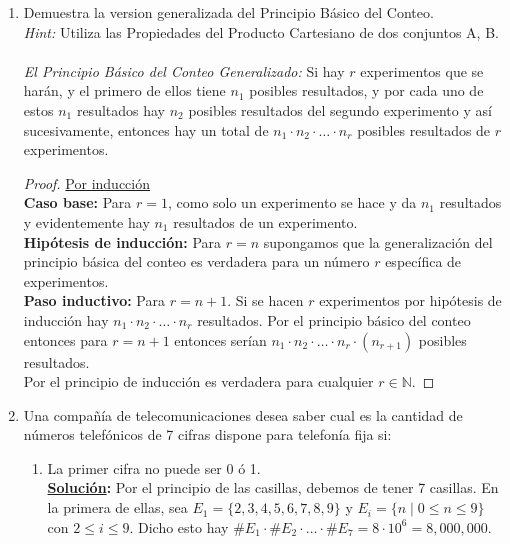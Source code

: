 \documentclass[11pt,letterpaper]{report}
\newcommand{\N}{\mathbb{N}}
\newcommand{\sol}{\textbf{\underline{Solución}: }} %
\begin{document}
\begin{enumerate}

\item Demuestra la version generalizada del Principio Básico del Conteo.\\
\textit{Hint:} Utiliza las Propiedades del Producto Cartesiano de dos conjuntos A, B.\\\\
\textit{El Principio Básico del Conteo Generalizado: } Si hay $r$ experimentos que se harán,
y el primero de ellos tiene $n_1$ posibles resultados, y por cada uno de estos $n_1$ resultados
hay $n_2$ posibles resultados del segundo experimento y así sucesivamente, entonces hay un
total de $n_1 \cdot n_2 \cdot \ldots \cdot n_r$ posibles resultados de $r$ experimentos.
\begin{proof}
    \underline{Por inducción}\\
    \textbf{Caso base:} Para $r=1$, como solo un experimento se hace y da $n_1$ resultados y
    evidentemente hay $n_1$ resultados de un experimento.\\
    \textbf{Hipótesis de inducción:} Para $r=n$ supongamos que la generalización del
    principio básica del conteo es verdadera para un número $r$ específica de experimentos.\\
    \textbf{Paso inductivo: } Para $r=n+1$. Si se hacen $r$ experimentos por hipótesis de inducción
    hay $n_1 \cdot n_2 \cdot \ldots \cdot n_r$ resultados. Por el principio básico del conteo entonces
    para $r=n+1$ entonces serían $n_1 \cdot n_2 \cdot \ldots \cdot n_r \cdot (n_{r+1})$ posibles
    resultados.\\
    Por el principio de inducción es verdadera para cualquier $r \in \N$.
\end{proof}

\item Una compañía de telecomunicaciones desea saber cual es la cantidad de números telefónicos de 7
cifras dispone para telefonía fija si:
\begin{enumerate}[label=\alph*)]
    \item La primer cifra no puede ser 0 ó 1.\\
    \sol Por el principio de las casillas, debemos de tener 7 casillas. En la primera de ellas,
    sea $E_1 = \{ 2,3,4,5,6,7,8,9\}$ y $E_i = \{n \mid 0 \leq n \leq 9\}$ con
    $2 \leq i \leq  9$. Dicho esto hay
    $\#E_1 \cdot \#E_2 \cdot \ldots \cdot \#E_7 = 8 \cdot 10^{6} = 8,000,000$.


\end{enumerate}
\end{enumerate}
\end{document}
